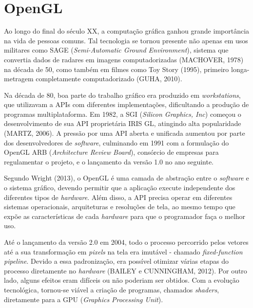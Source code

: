 \chapter{OpenGL}
Ao longo do final do século XX, a computação gráfica ganhou grande importância na vida de pessoas comuns. Tal tecnologia se tornou presente não apenas em usos militares como SAGE (\textit{Semi-Automatic Ground Environment}), sistema que convertia dados de radares em imagens computadorizadas (MACHOVER, 1978) na década de 50, como também em filmes como Toy Story (1995), primeiro longa-metragem completamente computadorizado (GUHA, 2010).


Na década de 80, boa parte do trabalho gráfico era produzido em \textit{workstations}, que utilizavam a APIs com diferentes implementações, dificultando a produção de programas multiplataforma. Em 1982, a SGI (\textit{Silicon Graphics, Inc}) começou o desenvolvimento de sua API proprietária IRIS GL, atingindo alta popularidade (MARTZ, 2006). A pressão por uma API aberta e unificada aumentou por parte dos desenvolvedores de \textit{software}, culminando em 1991 com a formulação do OpenGL ARB (\textit{Architecture Review Board}), consórcio de empresas para regulamentar o projeto, e o lançamento da versão 1.0 no ano seguinte.

Segundo Wright (2013), o OpenGL é uma camada de abstração entre o \textit{software} e o sistema gráfico, devendo permitir que a aplicação execute independente dos diferentes tipos de \textit{hardware}. Além disso, a API precisa operar em diferentes sistemas operacionais, arquiteturas e resoluções de tela, ao mesmo tempo que expõe as características de cada \textit{hardware} para que o programador faça o melhor uso.

Até o lançamento da versão 2.0 em 2004, todo o processo percorrido pelos vetores até a sua transformação em \textit{pixels} na tela era imutável - chamado \textit{fixed-function pipeline}. Devido a essa padronização, era possível otimizar várias etapas do processo diretamente no \textit{hardware} (BAILEY e CUNNINGHAM, 2012). Por outro lado, alguns efeitos eram difíceis ou não poderiam ser obtidos. Com a evolução tecnológica, tornou-se viável a criação de programas, chamados \textit{shaders}, diretamente para a GPU (\textit{Graphics Processing Unit}).

